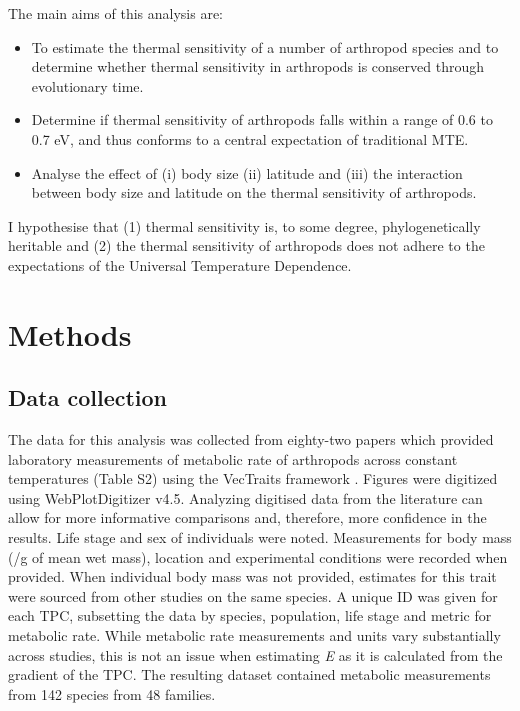 \documentclass[11pt]{article}
\begin{document}
\begin{flushleft}
The main aims of this analysis are:
\begin{itemize}
    \item To estimate the thermal sensitivity of a number of arthropod species and to determine whether thermal sensitivity in arthropods is conserved through evolutionary time.
    \item Determine if thermal sensitivity of arthropods falls within a range of 0.6 to 0.7 eV, and thus conforms to a central expectation of traditional MTE.
    \item Analyse the effect of (i) body size (ii) latitude and (iii) the interaction between body size and latitude on the thermal sensitivity of arthropods.
\end{itemize}

I hypothesise that (1) thermal sensitivity is, to some degree, phylogenetically heritable and (2) the thermal sensitivity of arthropods does not adhere to the expectations of the Universal Temperature Dependence.
\clearpage

\section{Methods}
\subsection{Data collection}
The data for this analysis was collected from eighty-two papers which provided laboratory measurements of metabolic rate of arthropods across constant temperatures (Table S2) using the VecTraits framework \citep{samraat_pawar_2016_57356}. Figures were digitized using WebPlotDigitizer v4.5. Analyzing digitised data from the literature can allow for more informative comparisons and, therefore, more confidence in the results. Life stage and sex of individuals were noted. Measurements for body mass (/g of mean wet mass), location and experimental conditions were recorded when provided. When individual body mass was not provided, estimates for this trait were sourced from other studies on the same species. A unique ID was given for each TPC, subsetting the data by species, population, life stage and metric for metabolic rate. While metabolic rate measurements and units vary substantially across studies, this is not an issue when estimating \emph{E} as it is calculated from the gradient of the TPC. The resulting dataset contained metabolic measurements from 142 species from 48 families. 
\linebreak


\end{flushleft}
\end{document}

